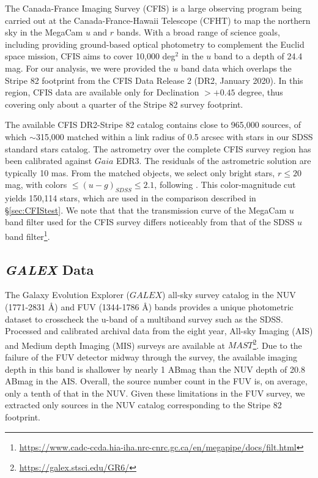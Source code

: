 \documentclass[fleqn,usenatbib]{mnras}
\begin{document}
The Canada-France Imaging Survey (CFIS) \citep{2017ApJ...848..128I} is a large observing program being carried out at the Canada-France-Hawaii Telescope (CFHT) to map the northern sky in the MegaCam $u$ and $r$ bands. With a broad range of science goals, including providing ground-based optical photometry to complement the Euclid space mission, CFIS aims to cover 10,000 deg$^2$ in the $u$ band to a depth of 24.4 mag. For our analysis, we were provided the $u$ band data which 
overlaps the Stripe 82 footprint from the CFIS Data Release 2 (DR2, January 2020). In this region, CFIS data are available
only for Declination $>+0.45$ degree, thus covering only about a quarter of the Stripe 82 survey footprint. 

The available CFIS DR2-Stripe 82 catalog contains close to 965,000 sources, of which $\sim$315,000 matched within 
a link radius of 0.5 arcsec with stars in our SDSS standard stars catalog. The astrometry over the complete CFIS survey 
region has been calibrated against $Gaia$ EDR3.  The residuals of the astrometric solution are typically 10 mas.  From the matched objects, we select only bright stars, $r \leq 20$ mag,  with colors  $\leq (u-g)_{SDSS} \leq 2.1$, following \cite{2017ApJ...848..128I}. This color-magnitude cut yields 150,114 stars, which are used in the comparison described in \S \ref{sec:CFIStest}.  We note that that the transmission curve of the MegaCam $u$ band filter used for the CFIS survey differs noticeably from that of the SDSS $u$ band filter\footnote{\url{https://www.cadc-ccda.hia-iha.nrc-cnrc.gc.ca/en/megapipe/docs/filt.html}}.



\subsection{{\it GALEX} Data} \label{ssec:galex}

The Galaxy Evolution Explorer ($GALEX$) all-sky survey catalog in the NUV (1771-2831 \AA) and FUV (1344-1786 \AA) bands provides a unique photometric dataset to crosscheck the u-band of a multiband survey such as the SDSS. Processed and calibrated archival data from the eight year, All-sky Imaging (AIS) and Medium depth Imaging (MIS) surveys are available at $MAST$\footnote{\url{https://galex.stsci.edu/GR6/}}. Due to the failure of the FUV detector midway through the survey, the available imaging depth in this band is shallower by nearly 1 ABmag than the NUV depth of 20.8 ABmag in the AIS. Overall, the source number count in the FUV is, on average, only a tenth of that in the NUV. Given these limitations in the FUV survey, we extracted only sources in the NUV catalog corresponding to the Stripe 82 footprint.  
 
\end{document}
